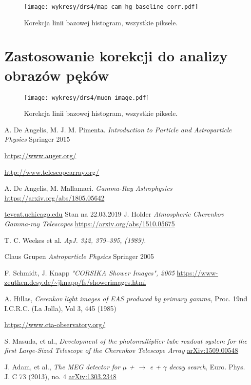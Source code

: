 \documentclass[a4paper,11pt,twoside]{article}
\begin{document}
\begin{figure}[H] 
\centering
\texttt{[image: wykresy/drs4/map\_cam\_hg\_baseline\_corr.pdf]}
\caption{Korekcja linii bazowej histogram, wszystkie piksele.}
\label{fig:dt_curve_fit_few_pixels}
\end{figure}
\section{Zastosowanie korekcji do analizy obrazów pęków}
\begin{figure}[H] 
\centering
\texttt{[image: wykresy/drs4/muon\_image.pdf]}
\caption{Korekcja linii bazowej histogram, wszystkie piksele.}
\label{fig:dt_curve_fit_few_pixels}
\end{figure}
\begin{thebibliography}{9}
A. De Angelis, M. J. M. Pimenta.
\textit{Introduction to Particle and Astroparticle Physics} Springer 2015

\url{https://www.auger.org/}

\url{http://www.telescopearray.org/}

A. De Angelis, M. Mallamaci.
\textit{Gamma-Ray Astrophysics} 
\url{https://arxiv.org/abs/1805.05642}

\url{tevcat.uchicago.edu}
Stan na 22.03.2019
J. Holder
\textit{Atmospheric Cherenkov Gamma-ray Telescopes}
\url{https://arxiv.org/abs/1510.05675}

T. C. Weekes et al.
\textit{ApJ. 342, 379–395, (1989).}

Claus Grupen
\textit{Astroparticle Physics} Springer 2005

F. Schmidt, J. Knapp
\textit{"CORSIKA Shower Images", 2005}
\url{https://www-zeuthen.desy.de/~jknapp/fs/showerimages.html}

A. Hillas, 
\textit{Cerenkov light images of EAS produced by primary gamma},
Proc. 19nd I.C.R.C. (La Jolla), Vol 3, 445 (1985)

\url{https://www.cta-observatory.org/}

S. Masuda, et al., 
\textit{Development of the photomultiplier tube readout
system for the first Large-Sized Telescope of the
Cherenkov Telescope Array}
\url{arXiv:1509.00548}

J. Adam, et al.,
\textit{The MEG detector for $\mu$ + $\rightarrow$ e + $\gamma$ decay search}, Euro. Phys. J. C 73 (2013), no. 4
\url{arXiv:1303.2348}


\end{thebibliography}
\end{document}
